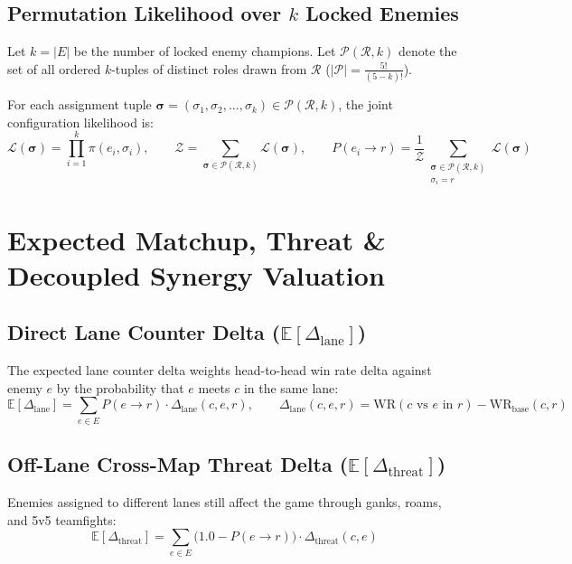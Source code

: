 \documentclass[11pt,a4paper]{article}
\begin{document}
\subsection{Permutation Likelihood over $k$ Locked Enemies}
Let $k = |E|$ be the number of locked enemy champions. Let $\mathcal{P}(\mathcal{R}, k)$ denote the set of all ordered $k$-tuples of distinct roles drawn from $\mathcal{R}$ ($|\mathcal{P}| = \frac{5!}{(5-k)!}$).

For each assignment tuple $\boldsymbol{\sigma} = (\sigma_1, \sigma_2, \dots, \sigma_k) \in \mathcal{P}(\mathcal{R}, k)$, the joint configuration likelihood is:
\begin{equation}
\mathcal{L}(\boldsymbol{\sigma}) = \prod_{i=1}^k \pi(e_i, \sigma_i), \qquad \mathcal{Z} = \sum_{\boldsymbol{\sigma} \in \mathcal{P}(\mathcal{R}, k)} \mathcal{L}(\boldsymbol{\sigma}), \qquad P(e_i \to r) = \frac{1}{\mathcal{Z}} \sum_{\substack{\boldsymbol{\sigma} \in \mathcal{P}(\mathcal{R}, k) \\ \sigma_i = r}} \mathcal{L}(\boldsymbol{\sigma})
\end{equation}

\section{Expected Matchup, Threat \& Decoupled Synergy Valuation}

\subsection{Direct Lane Counter Delta ($\mathbb{E}[\Delta_{\text{lane}}]$)}
The expected lane counter delta weights head-to-head win rate delta against enemy $e$ by the probability that $e$ meets $c$ in the same lane:
\begin{equation}
\mathbb{E}[\Delta_{\text{lane}}] = \sum_{e \in E} P(e \to r) \cdot \Delta_{\text{lane}}(c, e, r), \qquad \Delta_{\text{lane}}(c, e, r) = \text{WR}(c \text{ vs } e \text{ in } r) - \text{WR}_{\text{base}}(c, r)
\end{equation}

\subsection{Off-Lane Cross-Map Threat Delta ($\mathbb{E}[\Delta_{\text{threat}}]$)}
Enemies assigned to different lanes still affect the game through ganks, roams, and 5v5 teamfights:
\begin{equation}
\mathbb{E}[\Delta_{\text{threat}}] = \sum_{e \in E} \big(1.0 - P(e \to r)\big) \cdot \Delta_{\text{threat}}(c, e)
\end{equation}
\end{document}
